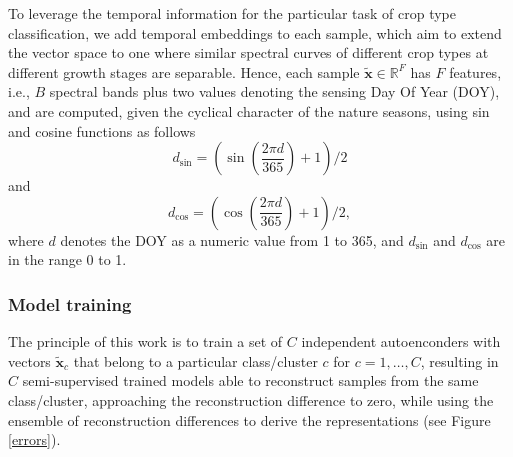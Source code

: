 \documentclass[journal,article,submit,pdftex,moreauthors]{Definitions/mdpi}
\begin{document}
To leverage the temporal information for the particular task of crop type classification, we add temporal embeddings to each sample, which aim to extend the vector space to one where similar spectral curves of different crop types at different growth stages are separable.
Hence, each sample $\mathbf{\tilde{x}} \in \mathbb{R}^F$
has $F$ features, i.e., $B$ spectral bands plus two values denoting the sensing Day Of Year (DOY), and are computed, given the cyclical character of the nature seasons, using sin and cosine functions as follows
\begin{equation}
	d_{\sin} = \left(\sin\left(\frac{2\pi d}{365}\right)+1\right)/2
\end{equation}
and
\begin{equation}
	d_{\cos} = \left(\cos\left(\frac{2\pi d}{365}\right)+1\right)/2, 
\end{equation}
where $d$ denotes the DOY as a numeric value from 1 to 365, and $d_{\sin}$ and $d_{\cos}$ are in the range 0 to 1.

\subsubsection{Model training}
The principle of this work is to train a set of $C$ independent autoenconders with vectors $\mathbf{\tilde{x}}_c$ that belong to a particular class/cluster $c$ for $c=1,\dots,C$,  resulting in $C$ semi-supervised trained models able to reconstruct samples from the same class/cluster, approaching the reconstruction difference to zero, while using the ensemble of reconstruction differences to derive the representations (see Figure \ref{errors}).
\end{document}
